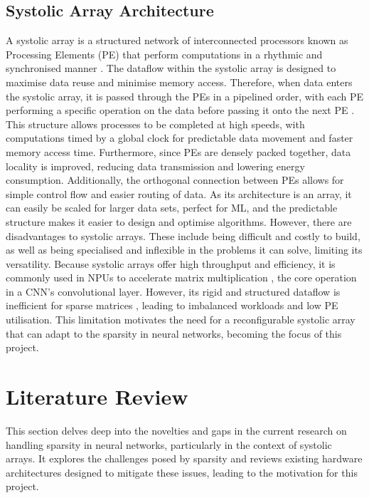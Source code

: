 \documentclass[12pt, a4paper, ukenglish]{article}
\begin{document}
    \subsection{Systolic Array Architecture} \label{sec: systolic array }
   A systolic array is a structured network of interconnected processors known as Processing Elements (PE) that perform computations in a rhythmic and synchronised manner \cite{kung_systolic_1978}. The dataflow within the systolic array is designed to maximise data reuse and minimise memory access. Therefore, when data enters the systolic array, it is passed through the PEs in a pipelined order, with each PE performing a specific operation on the data before passing it onto the next PE \cite{sun_sense_2023}. This structure allows processes to be completed at high speeds, with computations timed by a global clock for predictable data movement and faster memory access time. Furthermore, since PEs are densely packed together, data locality is improved, reducing data transmission and lowering energy consumption. Additionally, the orthogonal connection between PEs allows for simple control flow and easier routing of data. As its architecture is an array, it can easily be scaled for larger data sets, perfect for ML, and the predictable structure makes it easier to design and optimise algorithms. 
    \newline \newline
    However, there are disadvantages to systolic arrays. These include being difficult and costly to build, as well as being specialised and inflexible in the problems it can solve, limiting its versatility. Because systolic arrays offer high throughput and efficiency, it is commonly used in NPUs to accelerate matrix multiplication \cite{seo_versa_2024}, the core operation in a CNN's convolutional layer. However, its rigid and structured dataflow is inefficient for sparse matrices \cite{he_sparse-tpu_2020,sun_sense_2023}, leading to imbalanced workloads and low PE utilisation.  This limitation motivates the need for a reconfigurable systolic array that can adapt to the sparsity in neural networks, becoming the focus of this project.
    
\section{Literature Review} \label{sec: literature review}


    This section delves deep into the novelties and gaps in the current research on handling sparsity in neural networks, particularly in the context of systolic arrays. It explores the challenges posed by sparsity and reviews existing hardware architectures designed to mitigate these issues, leading to the motivation for this project.   
\end{document}
